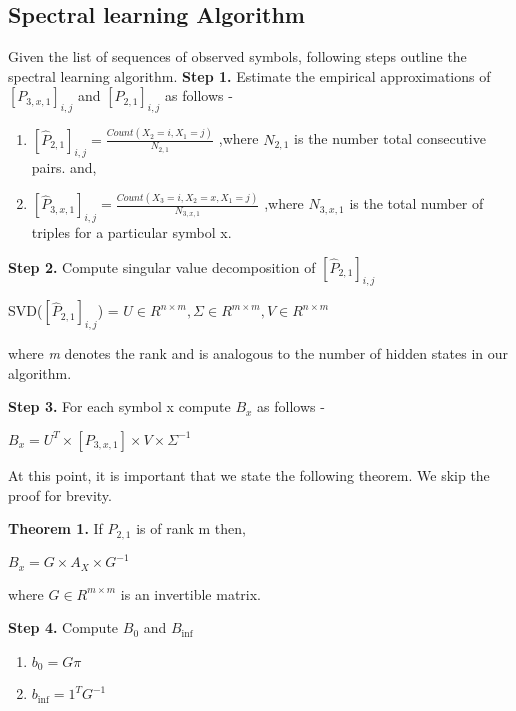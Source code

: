 \documentclass{article} %
\begin{document}
\subsection{Spectral learning Algorithm}
Given the list of sequences of observed symbols, following steps outline the spectral learning algorithm.
\newline
\newline
\textbf{Step 1.} Estimate the empirical approximations of $[P_{3,x,1}]_{i,j}$ and $[P_{2,1}]_{i,j}$ as follows - 
\begin{enumerate}
 \item $[\hat{P}_{2,1}]_{i,j} = \frac{Count(X_2 = i, X_1 = j)}{N_{2,1}}$ ,where $N_{2,1}$ is the number total consecutive pairs. and,
\item $[\hat{P}_{3,x,1}]_{i,j} = \frac{Count(X_3 = i, X_2 = x, X_1 = j)}{N_{3,x,1}}$ ,where $N_{3,x,1}$ is the total number of triples for a particular symbol x.
\end{enumerate}

\textbf{Step 2.} Compute singular value decomposition of $[\hat{P}_{2,1}]_{i,j}$ 
\begin{center} SVD($[\hat{P}_{2,1}]_{i,j}$) = $U \in R^{n\times m} ,  \Sigma \in R^{m\times m} , V \in R^{n \times m}$
\end{center}
where \textit{m} denotes the rank and is analogous to the number of hidden states in our algorithm.

\textbf{Step 3.} For each symbol x compute $B_x$ as follows -
\begin{center}
$B_x = U^T \times [P_{3,x,1}] \times V \times \Sigma^{-1}$
\end{center}

At this point, it is important that we state the following theorem. We skip the proof for brevity.

\textbf{Theorem 1.} If $P_{2,1}$ is of rank m then,
\begin{center}
$B_x = G \times A_X \times G^{-1}$
\end{center}
where $G \in R^{m \times m}$ is an invertible matrix.

\textbf{Step 4.} Compute $B_{0}$ and $B_{\inf}$
\begin{enumerate}
\item $b_{0} = G\pi$ 
\item $b_{\inf} = 1^TG^{-1}$
\end{enumerate}
\end{document}
